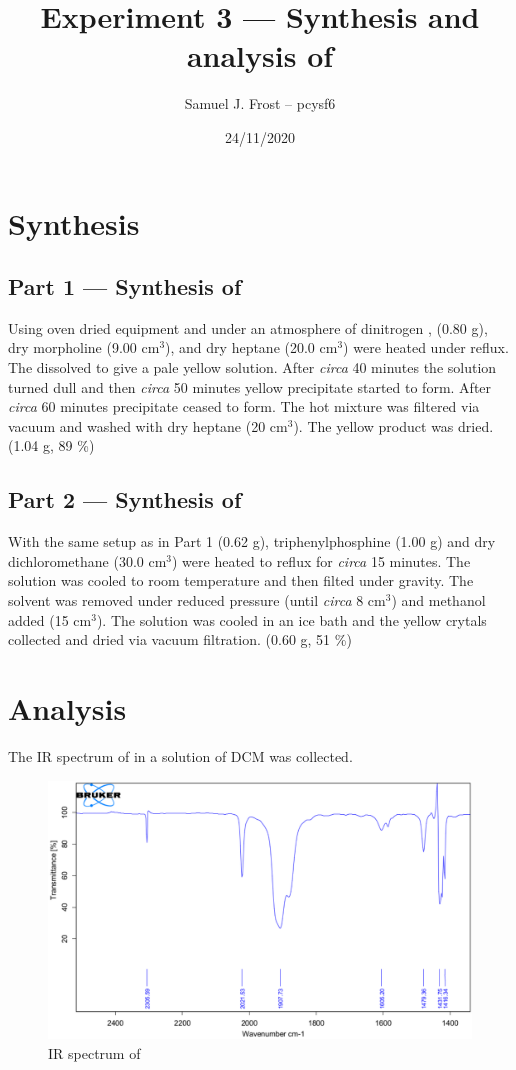 \documentclass{article}
\title{Experiment 3 --- Synthesis and analysis of \ce{[Mo(CO)4(PPh3)2]}}
\date{24/11/2020}
\author{Samuel J. Frost -- pcysf6}
\newcommand{\cc}{$\text{cm}^{3}$}
\newcommand{\circa}{\emph{circa }}
\begin{document}
\maketitle

\section*{Synthesis}
\subsection*{Part 1 --- Synthesis of \ce{[Mo(CO)4(morpholine)2]}}
Using oven dried equipment and under an atmosphere of dinitrogen \ce{[Mo(CO)6]}, (0.80 g), dry morpholine (9.00 \cc),
and dry heptane (20.0 \cc) were heated under reflux. The \ce{[Mo(CO)6]} dissolved to give a pale yellow solution.
After \circa 40 minutes the solution turned dull and then \circa 50 minutes yellow precipitate started to form.
After \circa 60 minutes precipitate ceased to form. The hot mixture was filtered via vacuum and washed 
with dry heptane (20 \cc). The yellow product was dried. (1.04 g, 89 \%)

\subsection*{Part 2 --- Synthesis of \ce{[Mo(CO)4(PPh3)2]}}
With the same setup as in Part 1 \ce{[Mo(CO)4(morpholine)2]} (0.62 g), triphenylphosphine (1.00 g) and 
dry dichloromethane (30.0 \cc) were heated to reflux for \circa 15 minutes. The solution was cooled to room temperature
and then filted under gravity. The solvent was removed under reduced pressure (until \circa 8 \cc) and methanol added (15 \cc).
The solution was cooled in an ice bath and the yellow crytals collected and dried via vacuum filtration. (0.60 g, 51 \%)

\newpage
\section*{Analysis}
The IR spectrum of \ce{[Mo(CO)4(PPh3)2]} in a solution of DCM was collected.

\begin{figure}[hp]
    \centering
    \captionsetup{justification=centering}
    \includegraphics[width=13cm]{sam3.pdf}
    \caption{IR spectrum of \ce{[Mo(CO)4(PPh3)2]}}
\end{figure}
\end{document}

